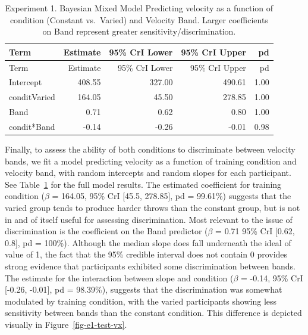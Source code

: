 \documentclass[
  12pt,
  letterpaper,
]{article}
\begin{document}
\begin{longtable}[]{@{}lrrrr@{}}
\caption{Experiment 1. Bayesian Mixed Model Predicting velocity as a
function of condition (Constant vs.~Varied) and Velocity Band. Larger
coefficients on Band represent greater
sensitivity/discrimination.}\label{tbl-e1-bmm-vx}\tabularnewline
\toprule\noalign{}
Term & Estimate & 95\% CrI Lower & 95\% CrI Upper & pd \\
\midrule\noalign{}
\endfirsthead
\toprule\noalign{}
Term & Estimate & 95\% CrI Lower & 95\% CrI Upper & pd \\
\midrule\noalign{}
\endhead
\bottomrule\noalign{}
\endlastfoot
Intercept & 408.55 & 327.00 & 490.61 & 1.00 \\
conditVaried & 164.05 & 45.50 & 278.85 & 1.00 \\
Band & 0.71 & 0.62 & 0.80 & 1.00 \\
condit*Band & -0.14 & -0.26 & -0.01 & 0.98 \\
\end{longtable}

Finally, to assess the ability of both conditions to discriminate
between velocity bands, we fit a model predicting velocity as a function
of training condition and velocity band, with random intercepts and
random slopes for each participant. See Table~\ref{tbl-e1-bmm-vx} for
the full model results. The estimated coefficient for training condition
(\(\beta\) = 164.05, 95\% CrI {[}45.5, 278.85{]}, pd = 99.61\%) suggests
that the varied group tends to produce harder throws than the constant
group, but is not in and of itself useful for assessing discrimination.
Most relevant to the issue of discrimination is the coefficient on the
Band predictor (\(\beta\) = 0.71 95\% CrI {[}0.62, 0.8{]}, pd = 100\%).
Although the median slope does fall underneath the ideal of value of 1,
the fact that the 95\% credible interval does not contain 0 provides
strong evidence that participants exhibited some discrimination between
bands. The estimate for the interaction between slope and condition
(\(\beta\) = -0.14, 95\% CrI {[}-0.26, -0.01{]}, pd = 98.39\%), suggests
that the discrimination was somewhat modulated by training condition,
with the varied participants showing less sensitivity between bands than
the constant condition. This difference is depicted visually in
Figure~\ref{fig-e1-test-vx}.
\end{document}
